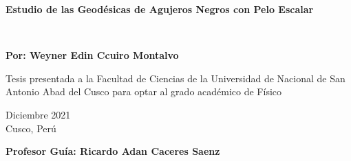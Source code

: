 \documentclass[../Main.tex]{subfiles}
\begin{document}
\begin{titlepage}
	
	
	\thispagestyle{frontpage}
	
	\begin{center}
		
		\vspace*{4\baselineskip}
	
		
		{\Huge \textbf{Estudio de las Geodésicas de Agujeros Negros con Pelo Escalar\\}}%
		        \vspace*{1.5\baselineskip}

		\large{\textit{}}\\ %
		
        \vspace*{1,5\baselineskip}

		\large{\textbf{Por: Weyner Edin Ccuiro Montalvo}}\\ %
		
		\vspace{1,5\baselineskip}
		
		\large{Tesis presentada a la Facultad de Ciencias de la Universidad de Nacional de San Antonio Abad del Cusco para optar al grado académico de Físico} %
		
		\vspace{1,5\baselineskip}
		Diciembre 2021\\ %
		Cusco, Perú %
\vspace{1,5\baselineskip}

		\large{\textbf{Profesor Guía: Ricardo Adan Caceres Saenz}}\\ %

	\end{center}
	
	\vspace*{4\baselineskip}
	
	
\end{titlepage}
\end{document}

